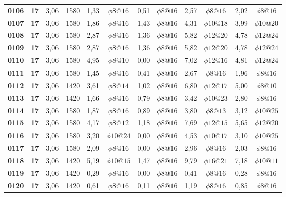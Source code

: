 \begin{table}[H]
{\begin{tabular}{|c|c|c|c|c|c|c|c|c|c|c|c|}
        \textbf{0106} & \textbf{17} & 3,06  & 1580  & 1,33  & $\phi8@16$ & 0,51  & $\phi8@16$ & 2,57  & $\phi8@16$ & 2,02  & $\phi8@16$ \\
        \textbf{0107} & \textbf{17} & 3,06  & 1580  & 1,86  & $\phi8@16$ & 1,43  & $\phi8@16$ & 4,31  & $\phi10@18$ & 3,99  & $\phi10@20$ \\
        \textbf{0108} & \textbf{17} & 3,06  & 1580  & 2,87  & $\phi8@16$ & 1,36  & $\phi8@16$ & 5,82  & $\phi12@20$ & 4,78  & $\phi12@24$ \\
        \textbf{0109} & \textbf{17} & 3,06  & 1580  & 2,87  & $\phi8@16$ & 1,36  & $\phi8@16$ & 5,82  & $\phi12@20$ & 4,78  & $\phi12@24$ \\
        \textbf{0110} & \textbf{17} & 3,06  & 1580  & 4,95  & $\phi8@10$ & 0,00  & $\phi8@16$ & 7,02  & $\phi12@16$ & 4,81  & $\phi12@24$ \\
        \textbf{0111} & \textbf{17} & 3,06  & 1580  & 1,45  & $\phi8@16$ & 0,41  & $\phi8@16$ & 2,67  & $\phi8@16$ & 1,96  & $\phi8@16$ \\
        \textbf{0112} & \textbf{17} & 3,06  & 1420  & 3,61  & $\phi8@14$ & 1,02  & $\phi8@16$ & 6,80  & $\phi12@17$ & 5,00  & $\phi8@10$ \\
        \textbf{0113} & \textbf{17} & 3,06  & 1420  & 1,66  & $\phi8@16$ & 0,79  & $\phi8@16$ & 3,42  & $\phi10@23$ & 2,80  & $\phi8@16$ \\
        \textbf{0114} & \textbf{17} & 3,06  & 1580  & 1,87  & $\phi8@16$ & 0,89  & $\phi8@16$ & 3,80  & $\phi8@13$ & 3,12  & $\phi10@25$ \\
        \textbf{0115} & \textbf{17} & 3,06  & 1580  & 4,17  & $\phi8@12$ & 1,18  & $\phi8@16$ & 7,69  & $\phi12@15$ & 5,65  & $\phi12@20$ \\
        \textbf{0116} & \textbf{17} & 3,06  & 1580  & 3,20  & $\phi10@24$ & 0,00  & $\phi8@16$ & 4,53  & $\phi10@17$ & 3,10  & $\phi10@25$ \\
        \textbf{0117} & \textbf{17} & 3,06  & 1580  & 2,09  & $\phi8@16$ & 0,00  & $\phi8@16$ & 2,96  & $\phi8@16$ & 2,03  & $\phi8@16$ \\
        \textbf{0118} & \textbf{17} & 3,06  & 1420  & 5,19  & $\phi10@15$ & 1,47  & $\phi8@16$ & 9,79  & $\phi16@21$ & 7,18  & $\phi10@11$ \\
        \textbf{0119} & \textbf{17} & 3,06  & 1420  & 0,29  & $\phi8@16$ & 0,00  & $\phi8@16$ & 0,41  & $\phi8@16$ & 0,28  & $\phi8@16$ \\
        \textbf{0120} & \textbf{17} & 3,06  & 1420  & 0,61  & $\phi8@16$ & 0,11  & $\phi8@16$ & 1,19  & $\phi8@16$ & 0,85  & $\phi8@16$ \\

\end{tabular}}
\end{table}

